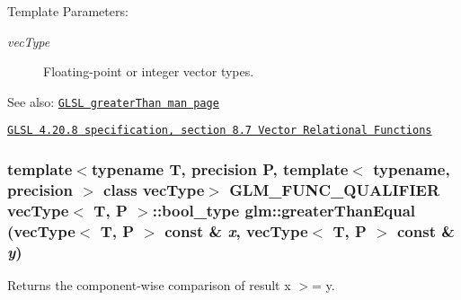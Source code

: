 \begin{Desc}
\item[Template Parameters:]
\begin{description}
\item[{\em vecType}]Floating-point or integer vector types.\end{description}
\end{Desc}
\begin{Desc}
\item[See also:]\href{http://www.opengl.org/sdk/docs/manglsl/xhtml/greaterThan.xml}{\tt GLSL greaterThan man page} 

\href{http://www.opengl.org/registry/doc/GLSLangSpec.4.20.8.pdf}{\tt GLSL 4.20.8 specification, section 8.7 Vector Relational Functions} \end{Desc}
\hypertarget{group__core__func__vector__relational_ga384b9c124d40d56bf5bd02ea9b04926}{
\subsubsection[greaterThanEqual]{\setlength{\rightskip}{0pt plus 5cm}template$<$typename T, precision P, template$<$ typename, precision $>$ class vecType$>$ GLM\_\-FUNC\_\-QUALIFIER vecType$<$ T, P $>$::bool\_\-type glm::greaterThanEqual (vecType$<$ T, P $>$ const \& {\em x}, \/  vecType$<$ T, P $>$ const \& {\em y})}}
\label{group__core__func__vector__relational_ga384b9c124d40d56bf5bd02ea9b04926}


Returns the component-wise comparison of result x $>$= y.

